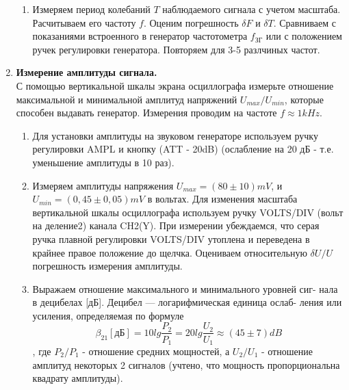 \documentclass[a4paper, 12pt]{article}%
\begin{document}
\begin{enumerate}
\begin{enumerate}
	\item Измеряем период колебаний $T$ наблюдаемого сигнала с учетом масштаба. Расчитываем его частоту $f$. Оценим погрешность $\delta F$ и $\delta T$. Сравниваем с показаниями встроенного в генератор частотометра $f_{\text{ЗГ}}$ или с положением ручек регулировки генератора. Повторяем для 3-5 разлчиных частот.
	\begin{figure} [h]
	\end{figure}
	\end{enumerate}
	\item \textbf{Измерение амплитуды сигнала.} \\С помощью вертикальной шкалы экрана осциллографа измерьте отношение максимальной и минимальной амплитуд напряжений $U_{max} / U_{min} $, которые способен выдавать генератор. Измерения проводим на частоте $f\approx 1 kHz$. 
	\begin{enumerate}
	\item Для установки амплитуды на звуковом генераторе используем ручку регулировки AMPL и кнопку (ATT - 20dB) (ослабление на 20 дБ - т.е. уменьшение амплитуды в 10 раз).
	\item Измеряем амплитуды напряжения $U_{max} = (80 \pm 10) mV$, и $U_{min} = (0,45 \pm 0,05) mV$ в вольтах. Для изменения масштаба вертикальной шкалы осциллографа используем ручку VOLTS/DIV (вольт на деление2) канала CH2(Y). При измерении убеждаемся, что серая ручка плавной регулировки VOLTS/DIV утоплена и переведена в крайнее правое положение до щелчка. Оцениваем относительную $\delta U/U$ погрешность измерения амплитуды.
	\item  Выражаем отношение максимального и минимального уровней сиг-
нала в децибелах [дБ]. Децибел — логарифмическая единица ослаб-
ления или усиления, определяемая по формуле
	\[\beta _{21} [\text{дБ}] = 10 lg\dfrac{P_2}{P_1} = 20 lg\dfrac{U_2}{U_1} \approx (45 \pm 7) dB\], где $P_2/P_1$ - отношение средних мощностей, а $U_2/U_1$ - отношение амплитуд некоторых 2 сигналов (учтено, что мощность пропорциональна квадрату амплитуды).

\end{enumerate}
\end{enumerate}
\end{document}
